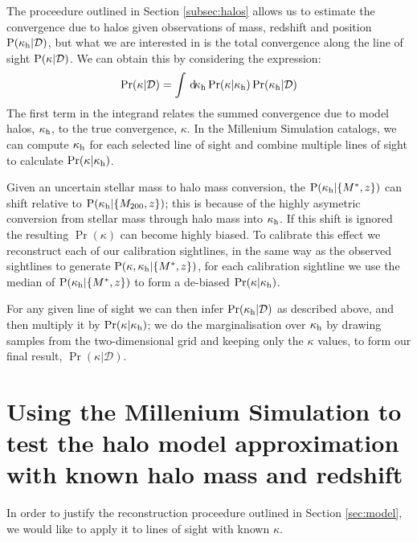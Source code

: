 \documentclass[useAMS,usenatbib]{mn2e}
\begin{document}
The proceedure outlined in Section \ref{subsec:halos} allows us to estimate 
the convergence due to halos given observations of mass, redshift and position
${\rm P}(\kappa_{\rm h}|\mathcal{D})$, but what we are interested in is the total convergence
along the line of sight ${\rm P}(\kappa|\mathcal{D})$. We can obtain this by
considering the expression:
\begin{equation}
\Pr(\kappa|\mathcal{D}) = \int \, \mathrm{d} \!\kappa_{\rm h} 
   \Pr(\kappa|\kappa_{\rm h}) \Pr(\kappa_{\rm h}|\mathcal{D})
\label{eq:kappaconv}   
\end{equation}
The first term in the integrand relates the summed convergence due to model
halos, $\kappa_{\rm h}$, to the true convergence, $\kappa$. In the Millenium
Simulation catalogs, we can compute $\kappa_{\rm h}$ for each
selected line of sight and combine multiple lines of sight to calculate $\Pr(\kappa|\kappa_{\rm h})$.

Given an uncertain stellar mass to halo mass conversion, the ${\rm P}(\kappa_{\rm h}|\{M^{*},z\})$ can shift 
relative to ${\rm P}(\kappa_{\rm h}|\{M_{200},z\})$; this is because of the highly asymetric conversion from
stellar mass through halo mass into $\kappa_{\rm h}$. If this shift is ignored the resulting $\Pr(\kappa)$
can become highly biased. To calibrate this effect we reconstruct each of our calibration
sightlines, in the same way as the observed sightlines to generate
 ${\rm P}(\kappa,\kappa_{\rm h}|\{M^{*},z\})$, for each calibration sightline we use the median of ${\rm P}(\kappa_{\rm h}|\{M^{*},z\})$ to form a de-biased $\Pr(\kappa|\kappa_{\rm h})$.

For any given line of sight we can then infer
$\Pr(\kappa_{\rm h}|\mathcal{D})$ as described above, and then
multiply it by $\Pr(\kappa|\kappa_{\rm h})$; we do the marginalisation over $\kappa_{\rm h}$
by drawing samples from the two-dimensional grid and keeping only the
$\kappa$ values, to form our final result, $\Pr(\kappa|\mathcal{D})$.


\section{Using the Millenium Simulation to test the halo model approximation with known halo mass and redshift}
\label{sec:knownMh+z} 

In order to justify the reconstruction proceedure outlined in Section \ref{sec:model}, we would like to apply it to lines of sight with known $\kappa$. 
\end{document}
